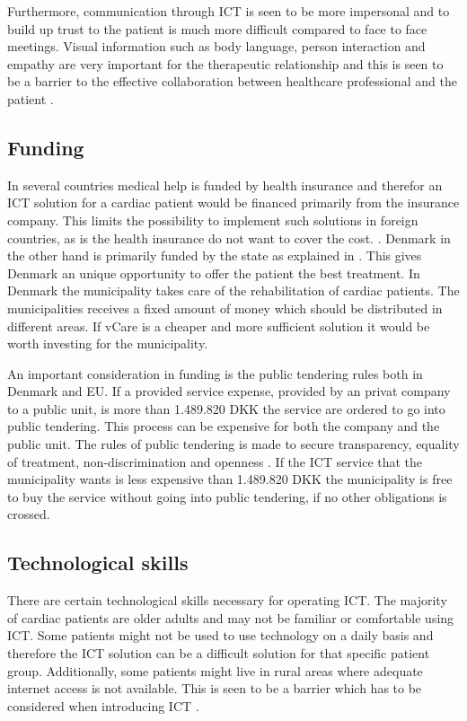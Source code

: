 Furthermore, communication through ICT is seen to be more impersonal and to build up trust to the patient is much more difficult compared to face to face meetings. Visual information such as body language, person interaction and empathy are very important for the therapeutic relationship and this is seen to be a barrier to the effective collaboration between healthcare professional and the patient \cite{barrier}.  

\subsection{Funding}

In several countries medical help is funded by health insurance and therefor an ICT solution for a cardiac patient would be financed primarily from the insurance company. This limits the possibility to implement such solutions in foreign countries, as is the health insurance do not want to cover the cost. \cite{considerations}. Denmark in the other hand is primarily funded by the state as explained in . This gives Denmark an unique opportunity to offer the patient the best treatment. In Denmark the municipality takes care of the rehabilitation of cardiac patients. The municipalities receives a fixed amount of money which should be distributed in different areas. If vCare is a cheaper and more sufficient solution it would be worth investing for the municipality. 

An important consideration in funding is the public tendering rules both in Denmark and EU. If a provided service expense, provided by an privat company to a public unit, is more than 1.489.820 DKK the service are ordered to go into public tendering. This process can be expensive for both the company and the public unit. The rules of public tendering is made to secure transparency, equality of treatment, non-discrimination and openness \cite{udbud}. If the ICT service that the municipality wants is less expensive than 1.489.820 DKK the municipality is free to buy the service without going into public tendering, if no other obligations is crossed. 

\subsection{Technological skills}
There are certain technological skills necessary for operating ICT. The majority of cardiac patients are older adults and may not be familiar or comfortable using ICT. Some patients might not be used to use technology on a daily basis and therefore the ICT solution can be a difficult solution for that specific patient group. Additionally, some patients might live in rural areas where adequate internet access is not available. This is seen to be a barrier which has to be considered when introducing ICT \cite{barrier}.  
   
